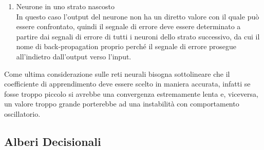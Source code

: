 \begin{enumerate}
	\item Neurone in uno strato nascosto \\
	In questo caso l'output del neurone non ha un diretto valore con il quale può essere confrontato, quindi il segnale di errore deve essere determinato a partire dai segnali di errore di tutti i neuroni dello strato successivo, da cui il nome di back-propagation proprio perché il segnale di errore prosegue all'indietro dall'output verso l'input.
\end{enumerate}
Come ultima considerazione sulle reti neurali bisogna sottolineare che il coefficiente di apprendimento deve essere scelto in maniera accurata, infatti se fosse troppo piccolo si avrebbe una convergenza estremamente lenta e, viceversa, un valore troppo grande porterebbe ad una instabilità con comportamento oscillatorio.

\newpage

\subsection{Alberi Decisionali}
\label{alberi decisionali}

